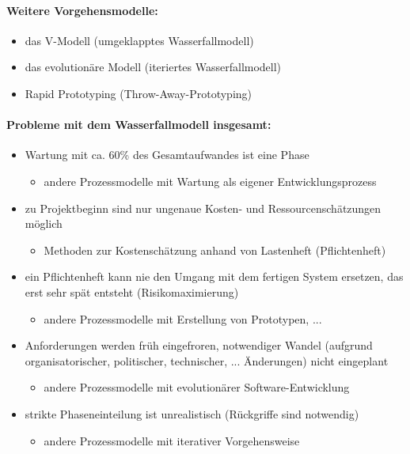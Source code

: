 \paragraph{Weitere Vorgehensmodelle:}
\begin{itemize}
	\item das V-Modell (umgeklapptes Wasserfallmodell)
	\item das evolutionäre Modell (iteriertes Wasserfallmodell)
	\item Rapid Prototyping (Throw-Away-Prototyping)
\end{itemize}

\paragraph{Probleme mit dem Wasserfallmodell insgesamt:}
\begin{itemize}
	\item Wartung mit ca. 60\% des Gesamtaufwandes ist eine Phase
	\begin{itemize}
		\item andere Prozessmodelle mit Wartung als eigener Entwicklungsprozess
	\end{itemize}
	\item zu Projektbeginn sind nur ungenaue Kosten- und Ressourcenschätzungen möglich
	\begin{itemize}
		\item Methoden zur Kostenschätzung anhand von Lastenheft (Pflichtenheft)
	\end{itemize}
	\item ein Pflichtenheft kann nie den Umgang mit dem fertigen System ersetzen, das erst sehr spät entsteht (Risikomaximierung)
	\begin{itemize}
		\item andere Prozessmodelle mit Erstellung von Prototypen, ...
	\end{itemize}
	\item Anforderungen werden früh eingefroren, notwendiger Wandel (aufgrund organisatorischer, politischer, technischer, ... Änderungen) nicht eingeplant
	\begin{itemize}
		\item andere Prozessmodelle mit evolutionärer Software-Entwicklung
	\end{itemize}
	\item strikte Phaseneinteilung ist unrealistisch (Rückgriffe sind notwendig)
	\begin{itemize}
		\item andere Prozessmodelle mit iterativer Vorgehensweise
	\end{itemize}
\end{itemize}

